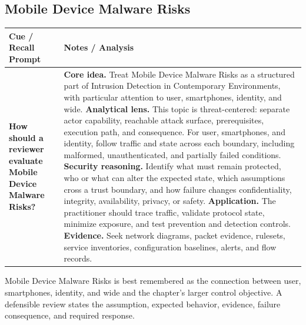 \documentclass[11pt]{article}
\newcommand{\CornellHeader}{%
\rowcolor{Navy}\color{white}\bfseries Cue / Recall Prompt & \color{white}\bfseries Notes / Analysis\\\hline}
\newcommand{\CornellRow}[2]{%
\cellcolor{CueGray}\RaggedRight\textbf{#1} & \RaggedRight #2\\\hline}
\begin{document}
\subsection*{Mobile Device Malware Risks}
\begin{longtable}{>{\RaggedRight\arraybackslash}p{}|>{\RaggedRight\arraybackslash}p{}}
\CornellHeader
\CornellRow{How should a reviewer evaluate Mobile Device Malware Risks?}{\textbf{Core idea.} Treat Mobile Device Malware Risks as a structured part of Intrusion Detection in Contemporary Environments, with particular attention to user, smartphones, identity, and wide. \textbf{Analytical lens.} This topic is threat-centered: separate actor capability, reachable attack surface, prerequisites, execution path, and consequence. For user, smartphones, and identity, follow traffic and state across each boundary, including malformed, unauthenticated, and partially failed conditions. \textbf{Security reasoning.} Identify what must remain protected, who or what can alter the expected state, which assumptions cross a trust boundary, and how failure changes confidentiality, integrity, availability, privacy, or safety. \textbf{Application.} The practitioner should trace traffic, validate protocol state, minimize exposure, and test prevention and detection controls. \textbf{Evidence.} Seek network diagrams, packet evidence, rulesets, service inventories, configuration baselines, alerts, and flow records.}
\end{longtable}
\begin{topicsummary}
Mobile Device Malware Risks is best remembered as the connection between user, smartphones, identity, and wide and the chapter's larger control objective. A defensible review states the assumption, expected behavior, evidence, failure consequence, and required response.
\end{topicsummary}
\end{document}
